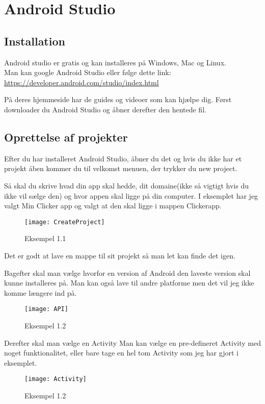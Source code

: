 \chapter{Android Studio}

\section{Installation}
Android studio er gratis og kan installeres på Windows, Mac og Linux.\\
Man kan google Android Studio eller følge dette link:\\
\url{https://developer.android.com/studio/index.html}

På deres hjemmeside har de guides og videoer som kan hjælpe dig.
Først downloader du Android Studio og åbner derefter den hentede fil.

\section{Oprettelse af projekter}
Efter du har installeret Android Studio, åbner du det og hvis du ikke har et projekt åben kommer du til velkomst menuen, der trykker du new project.

Så skal du skrive hvad din app skal hedde, dit domaine(ikke så vigtigt hvis du ikke vil sælge den) og hvor appen skal ligge på din computer. I eksemplet har jeg valgt Min Clicker app og valgt at den skal ligge i mappen Clickerapp. 
\begin{figure}[h]
	\texttt{[image: CreateProject]}
	\caption{Eksempel 1.1}
	\label{fig:createproject}
\end{figure}
Det er godt at lave en mappe til sit projekt så man let kan finde det igen. 

Bagefter skal man vælge hvorfor en version af Android den laveste version skal kunne installeres på. Man kan også lave til andre platforme men det vil jeg ikke komme længere ind på. 
\begin{figure}[h]
	\texttt{[image: API]}
	\caption{Eksempel 1.2}
	\label{fig:API}
\end{figure}

Derefter skal man vælge en Activity
Man kan vælge en pre-defineret Activity med noget funktionalitet, eller bare tage en hel tom Activity som jeg har gjort i eksemplet.

\begin{figure}[h]
	\texttt{[image: Activity]}
	\caption{Eksempel 1.2}
	\label{fig:Activiy}
\end{figure}

